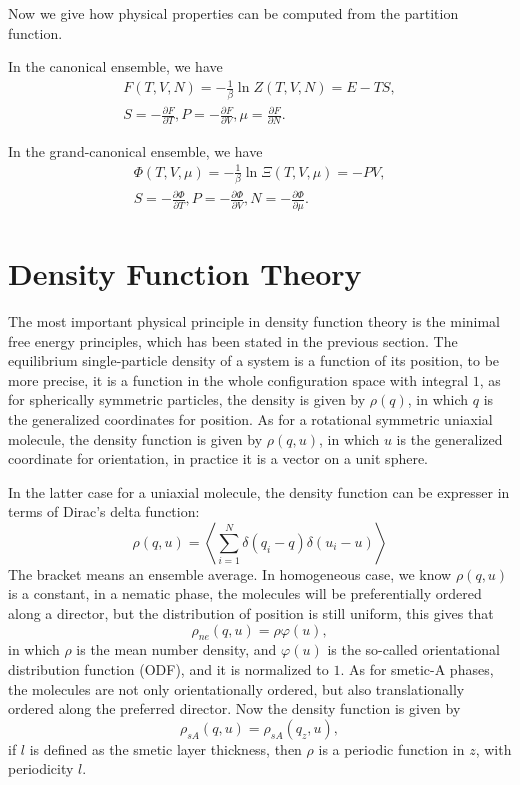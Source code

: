Now we give how physical properties can be computed from the partition function.

In the canonical ensemble, we have
\begin{equation}
	\begin{split}
		F(T,V,N) = -\frac{1}{\beta}\ln Z(T,V,N) = E-TS,\\
	S=-\frac{\partial F}{\partial T}, P=-\frac{\partial F}{\partial V}, \mu = \frac{\partial F}{\partial N}.
	\end{split}
\end{equation}

In the grand-canonical ensemble, we have
\begin{equation}
	\begin{split}
		\Phi(T,V,\mu) = -\frac{1}{\beta}\ln\Xi(T,V,\mu) = -PV,\\
		S=-\frac{\partial\Phi}{\partial T}, P = -\frac{\partial\Phi}{\partial V}, N = -\frac{\partial\Phi}{\partial\mu}.
	\end{split}
\end{equation}

\section{Density Function Theory}
The most important physical principle in density function theory is the minimal free energy principles, which has been stated in the previous section. The equilibrium single-particle density of a system is a function of its position, to be more precise, it is a function in the whole configuration space with integral $1$, as for spherically symmetric particles, the density is given by $\rho(q)$, in which $q$ is the generalized coordinates for position. As for a rotational symmetric uniaxial molecule, the density function is given by $\rho(q,u)$, in which $u$ is the generalized coordinate for orientation, in practice it is a vector on a unit sphere.

In the latter case for a uniaxial molecule, the density function can be expresser in terms of Dirac's delta function:
\begin{equation}\label{eqn:denDfn}
	\rho(q, u)=\left\langle\sum_{i=1}^{N} \delta (q_i-q)\delta(u_{i}-u)\right\rangle
\end{equation}
The bracket means an ensemble average. In homogeneous case, we know $\rho(q,u)$ is a constant, in a nematic phase, the molecules will be preferentially ordered along a director, but the distribution of position is still uniform, this gives that
\begin{equation}
	\rho_{ne}(q,u)=\rho\varphi(u),
\end{equation}
in which $\rho$ is the mean number density, and $\varphi(u)$ is the so-called orientational distribution function (ODF), and it is normalized to $1$. As for smetic-A phases, the molecules are not only orientationally ordered, but also translationally ordered along the preferred director. Now the density function is given by
\begin{equation}
	\rho_{sA}(q,u)=\rho_{sA}(q_z,u),
\end{equation}
if $l$ is defined as the smetic layer thickness, then $\rho$ is a periodic function in $z$, with periodicity $l$.

